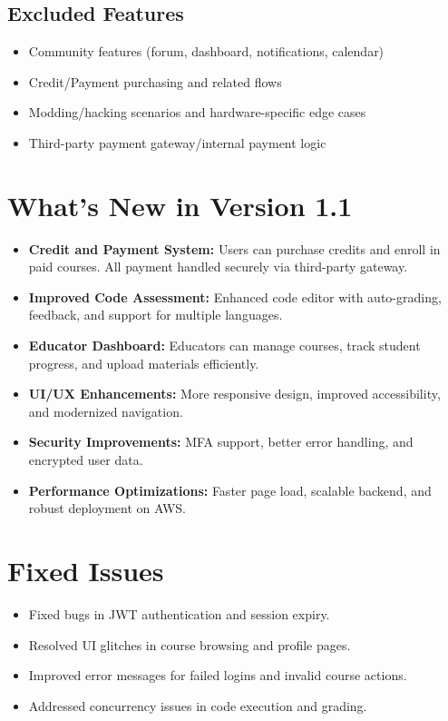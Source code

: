 \documentclass[a4paper,11pt]{scrartcl}
\begin{document}
\subsection{Excluded Features}
\begin{itemize}[leftmargin=*]
    \item Community features (forum, dashboard, notifications, calendar)
    \item Credit/Payment purchasing and related flows
    \item Modding/hacking scenarios and hardware-specific edge cases
    \item Third-party payment gateway/internal payment logic
\end{itemize}
\section{What's New in Version 1.1}

\begin{itemize}[leftmargin=*]
    \item \textbf{Credit and Payment System:} Users can purchase credits and enroll in paid courses. All payment handled securely via third-party gateway.
    \item \textbf{Improved Code Assessment:} Enhanced code editor with auto-grading, feedback, and support for multiple languages.
    \item \textbf{Educator Dashboard:} Educators can manage courses, track student progress, and upload materials efficiently.
    \item \textbf{UI/UX Enhancements:} More responsive design, improved accessibility, and modernized navigation.
    \item \textbf{Security Improvements:} MFA support, better error handling, and encrypted user data.
    \item \textbf{Performance Optimizations:} Faster page load, scalable backend, and robust deployment on AWS.
\end{itemize}

\section{Fixed Issues}

\begin{itemize}[leftmargin=*]
    \item Fixed bugs in JWT authentication and session expiry.
    \item Resolved UI glitches in course browsing and profile pages.
    \item Improved error messages for failed logins and invalid course actions.
    \item Addressed concurrency issues in code execution and grading.
\end{itemize}
\end{document}
